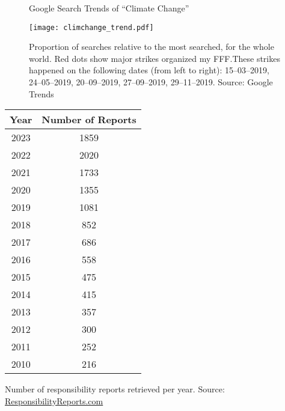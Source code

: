 \documentclass[12pt]{article}
\begin{document}
\vfill{}
\centering

\begin{figure}[ht]

    \caption{Google Search Trends of ``Climate Change''}\label{fig:cc_trend}
    \texttt{[image: climchange\_trend.pdf]}
    \captionsetup{font=footnotesize}
    \caption*{Proportion of searches relative to the most searched, for the whole world. Red dots show major strikes organized my FFF.\@ These strikes happened on the following dates (from left to right): 15--03--2019, 24--05--2019, 20--09--2019, 27--09--2019, 29--11--2019. Source: Google Trends}
\end{figure}

\begin{table}

    \label{tab:sust_reps}
    \centering

    \begin{tabular}{cc}
        \toprule
        Year & Number of Reports\\
        \midrule
        2023 & 1859\\
        2022 & 2020\\
        2021 & 1733\\
        2020 & 1355\\
        2019 & 1081\\
        2018 & 852\\
        2017 & 686\\
        2016 & 558\\
        2015 & 475\\
        2014 & 415\\
        2013 & 357\\
        2012 & 300\\
        2011 & 252\\
        2010 & 216\\
        \bottomrule
    \end{tabular}

    \vspace{0.2cm}

    \begin{tablenotes}
        \footnotesize
        \item Number of responsibility reports retrieved per year. Source: \href{https://responsibilityreports.com}{ResponsibilityReports.com}
    \end{tablenotes}

\end{table}
\end{document}
